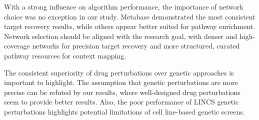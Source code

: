 With a strong influence on algorithm performance, the importance of network choice was no exception in our study. 
Metabase demonstrated the most consistent target recovery results, while others appear better suited for pathway enrichment. 
Network selection should be aligned with the research goal, with denser and high-coverage networks for precision target recovery and more structured, curated pathway resources for context mapping.

The consistent superiority of drug perturbations over genetic approaches is important to highlight. 
The assumption that genetic perturbations are more precise can be refuted by our results, where well-designed drug perturbations seem to provide better results. 
Also, the poor performance of \gls{LINCS} genetic perturbations highlights potential limitations of cell line-based genetic screens.

